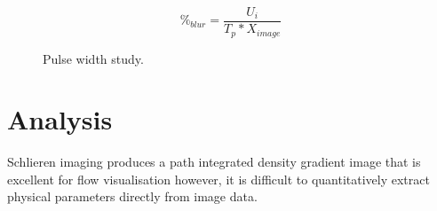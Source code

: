 \begin{equation}
\%_{blur} = \frac{U_i}{T_p*X_{image}}
\end{equation}
\begin{figure}[!tbh]
  \centering
  \hfill
  \caption{Pulse width study.}
  \label{fig:pulse}
\end{figure}

\newpage

\section{Analysis} \label{sect:post}

Schlieren imaging produces a path integrated density gradient image that is excellent for flow visualisation however, it is difficult to quantitatively extract physical parameters directly from image data. 


